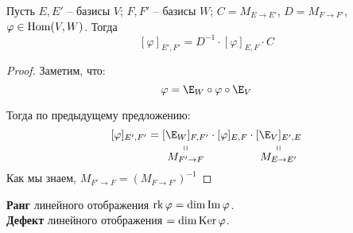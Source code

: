 \follow Пусть $E, E'$ -- базисы $V$; $F, F'$ -- базисы $W$;
$C = M_{E \to E'}$, $D = M_{F \to F'}$, $\varphi \in \operatorname{Hom}(V, W)$.
Тогда 
$$ [\varphi]_{E', F'} = D^{-1} \cdot [\varphi]_{E, F} \cdot C $$
\begin{proof}
    Заметим, что:
    $$ \varphi = \E_W \circ \varphi \circ \E_V $$

    Тогда по предыдущему предложению:
    $$ [\varphi]_{E', F'} = 
    \stackbelow{[\E_W]_{F, F'}}{M_{F' \to F}} 
    \cdot [\varphi]_{E, F}
    \cdot \stackbelow{[\E_V]_{E', E}}{M_{E \to E'}}$$
    Как мы знаем, $M_{F' \to F} = \left(M_{F \to F'}\right)^{-1}$
\end{proof}

\begin{conj} $ $\\
    \textbf{Ранг} линейного отображения $\operatorname{rk} \varphi
    = \dim \operatorname{Im} \varphi$. \\
    \textbf{Дефект} линейного отображения $= \dim \operatorname{Ker} \varphi$.
\end{conj}

